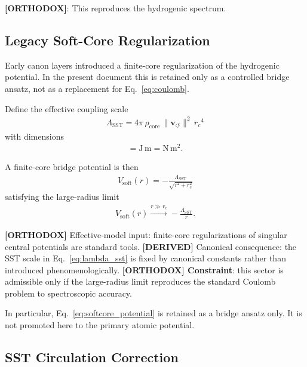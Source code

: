 \documentclass[11pt]{article}
\theoremstyle{definition}
\theoremstyle{plain}
\theoremstyle{remark}
\newcommand{\rhocore}{\rho_{\mathrm{core}}}
\newcommand{\rc}{{r_c}}
\newcommand{\vnorm}{\lVert \mathbf{v}_{\!\boldsymbol{\circlearrowleft}} \rVert}
\begin{document}
        \textbf{[ORTHODOX]}: This reproduces the hydrogenic spectrum.

    \subsection{Legacy Soft-Core Regularization}

        Early canon layers introduced a finite-core regularization of the hydrogenic potential. In the present document this is retained only as a controlled bridge ansatz, not as a replacement for Eq.~\eqref{eq:coulomb}.

        Define the effective coupling scale
        \begin{align}
            \Lambda_{\mathrm{SST}} = 4\pi \, \rhocore \, \vnorm^{2} \, \rc^{4}
            \label{eq:lambda_sst}
        \end{align}
        with dimensions
        \begin{align}
            [\Lambda_{\mathrm{SST}}] = \mathrm{J\,m} = \mathrm{N\,m^2}.
        \end{align}

        A finite-core bridge potential is then
        \begin{align}
            V_{\mathrm{soft}}(r) = -\frac{\Lambda_{\mathrm{SST}}}{\sqrt{r^2+r_c^2}}
            \label{eq:softcore_potential}
        \end{align}
        satisfying the large-radius limit
        \begin{align}
            V_{\mathrm{soft}}(r) \xrightarrow{r\gg r_c} -\frac{\Lambda_{\mathrm{SST}}}{r}.
        \end{align}

        \textbf{[ORTHODOX]} Effective-model input: finite-core regularizations of singular central potentials are standard tools.\newline
        \textbf{[DERIVED]} Canonical consequence: the SST scale in Eq.~\eqref{eq:lambda_sst} is fixed by canonical constants rather than introduced phenomenologically.\newline
        \textbf{[ORTHODOX] Constraint}: this sector is admissible only if the large-radius limit reproduces the standard Coulomb problem to spectroscopic accuracy.

        In particular, Eq.~\eqref{eq:softcore_potential} is retained as a bridge ansatz only. It is not promoted here to the primary atomic potential.

    \subsection{SST Circulation Correction}
        
\end{document}
